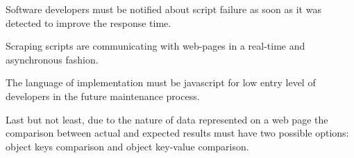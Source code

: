 Software developers must be notified about script failure as soon as it was detected to improve the response time. 

Scraping scripts are communicating with web-pages in a real-time and asynchronous fashion.


The language of implementation must be javascript for low entry level of developers in the future maintenance process.

Last but not least, due to the nature of data represented on a web page the comparison between actual and expected results must have two possible options: object keys comparison and object key-value comparison.


